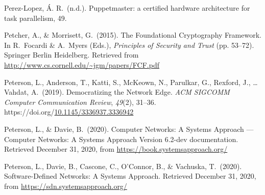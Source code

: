 \documentclass[12pt,twoside]{article}
\begin{document}
{\begin{thebibliography}{1079}
\mdbibitemlabel{}Perez-Lopez, Á. R.~(n.d.). Puppetmaster: a certified hardware architecture for task parallelism, 49.%

\mdbibitemlabel{}Petcher, A., \& Morrisett, G.~(2015). The Foundational Cryptography Framework. In R.~Focardi \& A.~Myers (Eds.), \emph{Principles of Security and Trust} (pp. 53–72). Springer Berlin Heidelberg. Retrieved from \href{http://www.cs.cornell.edu/~jgm/papers/FCF.pdf}{{\ttfamily http://\hspace{0pt}www.\hspace{0pt}cs.\hspace{0pt}cornell.\hspace{0pt}edu/\hspace{0pt}\textasciitilde{}jgm/\hspace{0pt}papers/\hspace{0pt}FCF.\hspace{0pt}pdf}}%

\mdbibitemlabel{}Peterson, L., Anderson, T., Katti, S., McKeown, N., Parulkar, G., Rexford, J., … Vahdat, A.~(2019). Democratizing the Network Edge. \emph{ACM SIGCOMM Computer Communication Review}, \emph{49}(2), 31–36. https://doi.org/\href{https://dx.doi.org/10.1145/3336937.3336942}{10.1145/3336937.3336942}%

\mdbibitemlabel{}Peterson, L., \& Davie, B.~(2020). Computer Networks: A Systems Approach — Computer Networks: A Systems Approach Version 6.2-dev documentation. Retrieved December 31, 2020, from \href{https://book.systemsapproach.org/}{{\ttfamily https://\hspace{0pt}book.\hspace{0pt}systemsapproach.\hspace{0pt}org/\hspace{0pt}}}%

\mdbibitemlabel{}Peterson, L., Davie, B., Cascone, C., O’Connor, B., \& Vachuska, T.~(2020). Software-Defined Networks: A Systems Approach. Retrieved December 31, 2020, from \href{https://sdn.systemsapproach.org/}{{\ttfamily https://\hspace{0pt}sdn.\hspace{0pt}systemsapproach.\hspace{0pt}org/\hspace{0pt}}}%


\end{thebibliography}}
\end{document}
